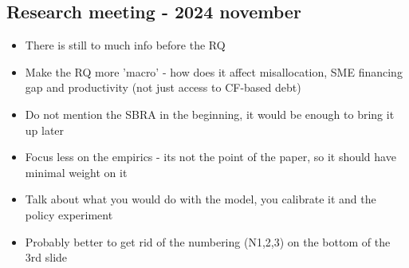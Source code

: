 \documentclass[12pt]{article}
\begin{document}
\subsection*{Research meeting - 2024 november} 
\begin{itemize}\setlength\itemsep{0em}  \small
    \item There is still to much info before the RQ
    \item Make the RQ more 'macro' - how does it affect misallocation, SME financing gap and productivity  (not just access to CF-based debt)
    \item Do not mention the SBRA in the beginning, it would be enough to bring it up later
    \item Focus less on the empirics - its not the point of the paper, so it should have minimal weight on it
    \item Talk about what you would do with the model, you calibrate it and the policy experiment
    \item Probably better to get rid of the numbering (N1,2,3) on the bottom of the 3rd slide
\end{itemize}
\end{document}
